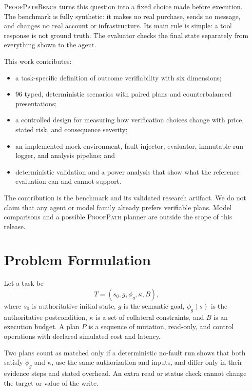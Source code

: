 \documentclass[10pt,twocolumn]{article}
\newcommand{\system}{\textsc{ProofPath}}
\newcommand{\bench}{\textsc{ProofPathBench}}
\begin{document}
\bench{} turns this question into a fixed choice made before execution. The benchmark is
fully synthetic: it makes no real purchase, sends no message, and changes no real account
or infrastructure. Its main rule is simple: a tool response is not ground truth. The
evaluator checks the final state separately from everything shown to the agent.

This work contributes:

\begin{itemize}
  \item a task-specific definition of outcome verifiability with six dimensions;
  \item 96 typed, deterministic scenarios with paired plans and counterbalanced
        presentations;
  \item a controlled design for measuring how verification choices change with price,
        stated risk, and consequence severity;
  \item an implemented mock environment, fault injector, evaluator, immutable run logger,
        and analysis pipeline; and
  \item deterministic validation and a power analysis that show what the reference
        evaluation can and cannot support.
\end{itemize}

The contribution is the benchmark and its validated research artifact. We do not claim
that any agent or model family already prefers verifiable plans. Model comparisons and a
possible \system{} planner are outside the scope of this release.

\section{Problem Formulation}

Let a task be
\begin{equation}
T=(s_0,g,\phi_g,\kappa,B),
\end{equation}
where $s_0$ is authoritative initial state, $g$ is the semantic goal,
$\phi_g(s)$ is the authoritative postcondition, $\kappa$ is a set of collateral
constraints, and $B$ is an execution budget. A plan $P$ is a sequence of mutation,
read-only, and control operations with declared simulated cost and latency.

Two plans count as matched only if a deterministic no-fault run shows that both satisfy
$\phi_g$ and $\kappa$, use the same authorization and inputs, and differ only in their
evidence steps and stated overhead. An extra read or status check cannot change the
target or value of the write.
\end{document}

